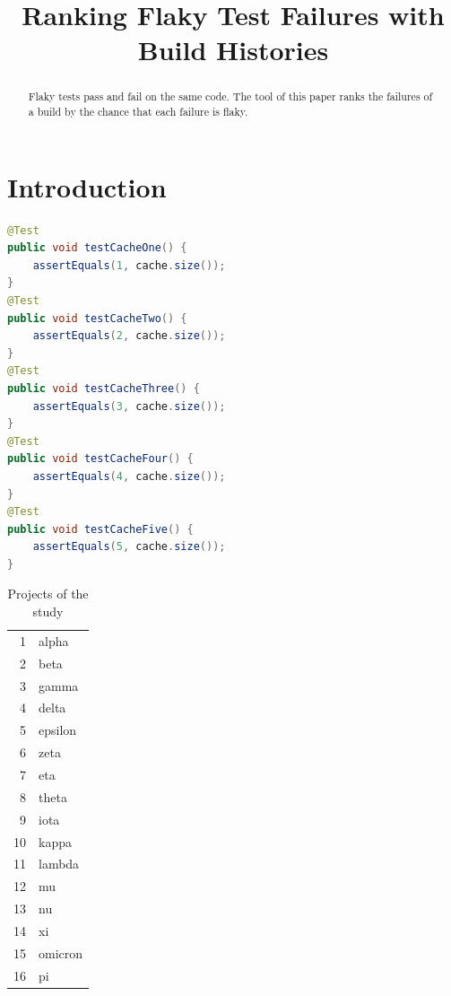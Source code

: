 \documentclass[10pt,conference]{IEEEtran}
\begin{document}
\title{Ranking Flaky Test Failures with Build Histories}
\author{}
\maketitle
\begin{abstract}
Flaky tests pass and fail on the same code. The tool of this paper ranks the failures of a build by the chance that
each failure is flaky.
\end{abstract}
\section{Introduction}
\lipsum[1-2]
\begin{lstlisting}[language=Java]
@Test
public void testCacheOne() {
    assertEquals(1, cache.size());
}
@Test
public void testCacheTwo() {
    assertEquals(2, cache.size());
}
@Test
public void testCacheThree() {
    assertEquals(3, cache.size());
}
@Test
public void testCacheFour() {
    assertEquals(4, cache.size());
}
@Test
public void testCacheFive() {
    assertEquals(5, cache.size());
}
\end{lstlisting}
\begin{table}[t]
\caption{Projects of the study}
\centering
\begin{tabular}{rl}
1 & alpha \\ 2 & beta \\ 3 & gamma \\ 4 & delta \\ 5 & epsilon \\ 6 & zeta \\ 7 & eta \\ 8 & theta \\
9 & iota \\ 10 & kappa \\ 11 & lambda \\ 12 & mu \\ 13 & nu \\ 14 & xi \\ 15 & omicron \\ 16 & pi \\
\end{tabular}
\end{table}
\lipsum[3-7]
\end{document}
